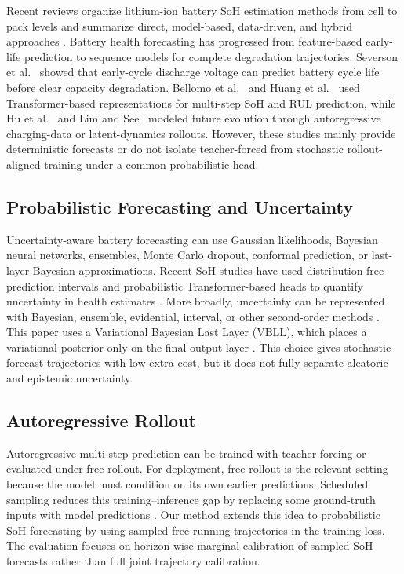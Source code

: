 \documentclass[conference]{IEEEtran}
\begin{document}
Recent reviews organize lithium-ion battery SoH estimation methods from cell
to pack levels and summarize direct, model-based, data-driven, and hybrid
approaches \cite{su2024sohreview}.
Battery health forecasting has progressed from feature-based early-life
prediction to sequence models for complete degradation trajectories. Severson
et al.~\cite{severson2019} showed that early-cycle discharge voltage can predict
battery cycle life before clear capacity degradation. Bellomo
et al.~\cite{bellomo2025transformersoh} and Huang et al.~\cite{huang2026ic2ml}
used Transformer-based representations for multi-step SoH and RUL prediction,
while Hu et al.~\cite{hu2025batterygpt} and Lim and
See~\cite{lim2026worldmodel} modeled future evolution through autoregressive
charging-data or latent-dynamics rollouts. However, these studies mainly
provide deterministic forecasts or do not isolate teacher-forced from
stochastic rollout-aligned training under a common probabilistic head.

\subsection{Probabilistic Forecasting and Uncertainty}

Uncertainty-aware battery forecasting can use Gaussian likelihoods, Bayesian
neural networks, ensembles, Monte Carlo dropout, conformal prediction, or
last-layer Bayesian approximations. Recent SoH studies have used
distribution-free prediction intervals and probabilistic Transformer-based heads to
quantify uncertainty in health estimates
\cite{rasul2026ensemble,munna2026fusion}.
More broadly, uncertainty can be represented with Bayesian, ensemble,
evidential, interval, or other second-order methods
\cite{wang2026uqreview}. This paper uses a Variational Bayesian Last Layer
(VBLL), which places a variational posterior only on the final output layer
\cite{harrison2024vbll}. This choice gives stochastic forecast trajectories
with low extra cost, but it does not fully separate aleatoric and epistemic
uncertainty.

\subsection{Autoregressive Rollout}

Autoregressive multi-step prediction can be trained with teacher forcing or
evaluated under free rollout. For deployment, free rollout is the relevant
setting because the model must condition on its own earlier predictions.
Scheduled sampling reduces this training--inference gap by replacing some
ground-truth inputs with model predictions \cite{bengio2015scheduled}. Our
method extends this idea to probabilistic SoH forecasting by using sampled
free-running trajectories in the training loss. The evaluation focuses on
horizon-wise marginal calibration of sampled SoH forecasts rather than full
joint trajectory calibration.
\end{document}
